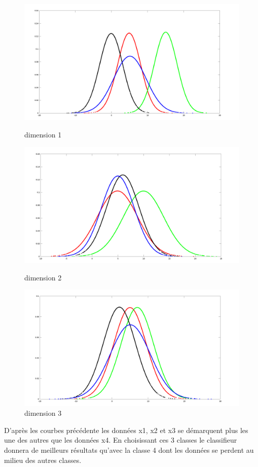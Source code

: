 \documentclass{article}
\begin{document}
\begin{figure}[h]
\centerline{\includegraphics[scale=0.24]{donnee1.png}}
\caption{dimension 1}

\centerline{\includegraphics[scale=0.24]{donnee2.png}}
\caption{dimension 2}

\centerline{\includegraphics[scale=0.24]{donnee3.png}}
\caption{dimension 3}
\end{figure}

D'après les courbes précédente les données x1, x2 et x3 se démarquent plus les une des autres que les données x4. En choisissant ces 3 classes le classifieur donnera de meilleurs résultats qu'avec la classe 4 dont les données se perdent au milieu des autres classes.
\end{document}
